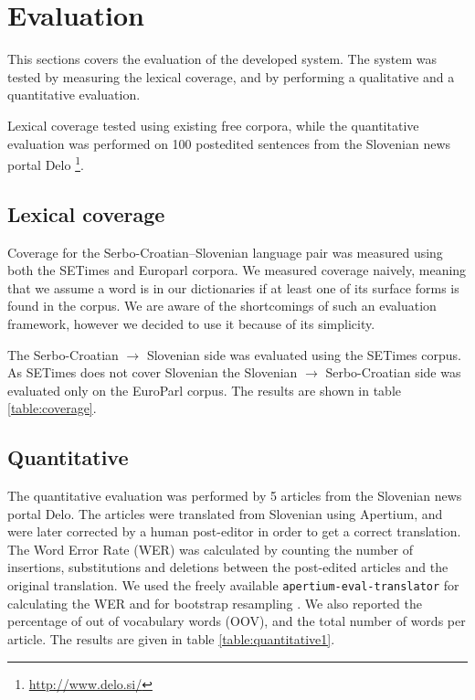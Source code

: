\section{Evaluation}

This sections covers the evaluation of the developed system. 
The system was tested by measuring the lexical coverage, and by performing
a qualitative and a quantitative evaluation. 

Lexical coverage tested using existing free corpora, 
while the quantitative evaluation was performed on 100 postedited sentences from the Slovenian news portal 
Delo \footnote{\url{http://www.delo.si/}}.


\subsection{Lexical coverage}

Coverage for the Serbo-Croatian--Slovenian language pair was measured using both the SETimes \citep{tyers2010south} and Europarl \citep{koehn05a} corpora. 
We measured coverage naively, meaning that we assume a word is in our 
dictionaries if at least one of its surface forms is found in the corpus. 
We are aware of the shortcomings of such an evaluation framework, 
however we decided to use it because of its simplicity.

The Serbo-Croatian $\rightarrow$ Slovenian side was evaluated using the SETimes corpus.
As SETimes does not cover Slovenian
the Slovenian $\rightarrow$ Serbo-Croatian side was evaluated only on the EuroParl corpus. The results are shown in table \ref{table:coverage}.

\subsection{Quantitative}

The quantitative evaluation was performed by 5 articles
from the Slovenian news portal Delo.
The articles were translated from Slovenian using Apertium, and were later corrected by a human post-editor in order to get a correct translation.
The Word Error Rate (WER) was calculated
by counting the number of insertions, substitutions and deletions between the post-edited articles
and the original translation. We used the freely available \texttt{apertium-eval-translator} for calculating the WER 
and for bootstrap resampling \cite{koehn04}.
We also reported the percentage of out of vocabulary words (OOV), and the total number of words per article.
The results are given in table \ref{table:quantitative1}.

